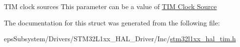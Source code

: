 T\-I\-M clock sources This parameter can be a value of \hyperlink{group___t_i_m___clock___source}{T\-I\-M Clock Source} 

The documentation for this struct was generated from the following file\-:\begin{DoxyCompactItemize}
\item 
eps\-Subsystem/\-Drivers/\-S\-T\-M32\-L1xx\-\_\-\-H\-A\-L\-\_\-\-Driver/\-Inc/\hyperlink{stm32l1xx__hal__tim_8h}{stm32l1xx\-\_\-hal\-\_\-tim.\-h}\end{DoxyCompactItemize}
